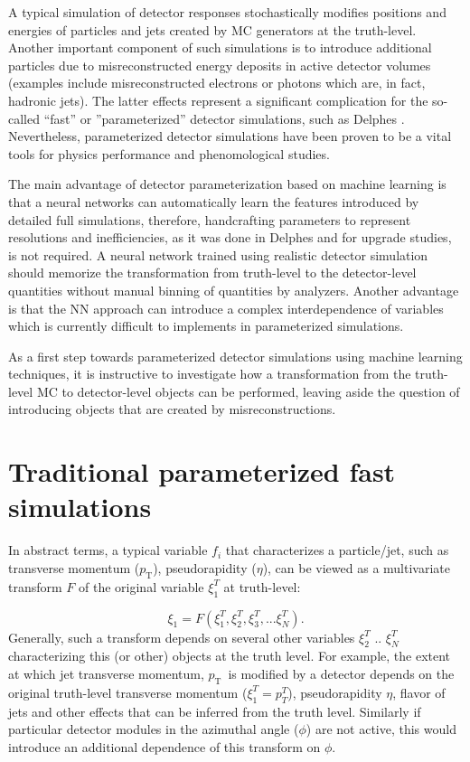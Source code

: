 \documentclass[showpacs,showkeys,preprint,prd,nofootinbib,linenumbers,12pt]{revtex4-1}
\def\pt{\ensuremath{p_{\mathrm{T}}}}
\begin{document}
A typical simulation of detector responses stochastically modifies positions and energies of particles and jets created by MC generators at the truth-level. Another important component of such simulations is to introduce additional particles due to misreconstructed energy deposits in active detector volumes  (examples include misreconstructed electrons or photons which are, in fact, hadronic jets). The latter effects represent a significant complication for the so-called ``fast'' or ''parameterized'' detector simulations, such as Delphes \cite{deFavereau:2013fsa}. Nevertheless, parameterized detector simulations have been proven to be a vital tools for physics performance and phenomological studies.

The main advantage of detector parameterization based on machine learning is that a neural networks can automatically learn the features introduced by detailed full simulations, therefore, handcrafting parameters to represent resolutions and inefficiencies, as it was done in Delphes and for upgrade studies, is not required. A neural network trained using realistic detector simulation should memorize the transformation from truth-level to the detector-level quantities without manual binning of quantities by analyzers. Another advantage is that the NN approach can introduce a complex interdependence of variables which is currently difficult to implements in parameterized simulations. %

As a first step towards parameterized detector simulations using machine learning techniques, it is instructive to investigate how a transformation from the truth-level MC to detector-level objects can be performed, leaving aside the question of introducing objects that are created by misreconstructions.

\section{Traditional parameterized fast simulations}

In abstract terms, a typical variable $f_i$ that characterizes a particle/jet, such as transverse momentum (\pt), pseudorapidity ($\eta$), can be viewed as a  multivariate transform $F$ of the original variable $\xi_1^T$ at truth-level:

$$
\xi_1 = F (\xi_1^T, \xi_2^T, \xi_3^T, ...\xi_N^T).
$$
Generally, such a transform  depends on several other variables $\xi_2^T$ ..  $\xi_N^T$ characterizing this (or other) objects at the truth level. For example, the extent at which jet transverse momentum, \pt\ is modified  by a detector depends on the original truth-level transverse momentum ($\xi_1^T=p_T^T$), pseudorapidity $\eta$,  flavor of jets and other effects that can be inferred from the truth level. Similarly if particular detector modules in the azimuthal angle ($\phi$) are not active, this would introduce an additional dependence of this transform on $\phi$.
\end{document}

